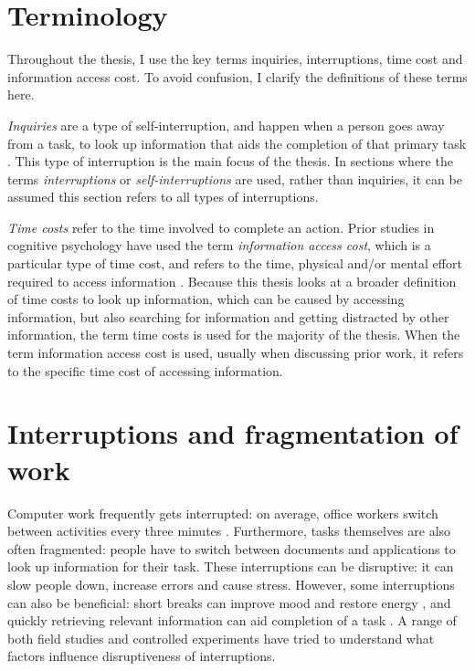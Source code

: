 \section{Terminology}
Throughout the thesis, I use the key terms inquiries, interruptions, time cost and information access cost. To avoid confusion, I clarify the definitions of these terms here.

\textit{Inquiries} are a type of self-interruption, and happen when a person goes away from a task, to look up information that aids the completion of that primary task \citep{Jin2009}. This type of interruption is the main focus of the thesis. In sections where the terms \textit{interruptions} or \textit{self-interruptions} are used, rather than inquiries, it can be assumed this section refers to all types of interruptions. 

\textit{Time costs} refer to the time involved to complete an action. Prior studies in cognitive psychology have used the term \textit{information access cost}, which  is a particular type of time cost, and refers to the time, physical and/or mental effort required to access information \citep{Gray2006}. Because this thesis looks at a broader definition of time costs to look up information, which can be caused by accessing information, but also searching for information and getting distracted by other information, the term time costs is used for the majority of the thesis. When the term information access cost is used, usually when discussing prior work, it refers to the specific time cost of accessing information. 

\section{Interruptions and fragmentation of work}
Computer work frequently gets interrupted: on average, office workers switch between activities every three minutes \citep{Gonzalez2004}. Furthermore, tasks themselves are also often fragmented: people have to switch between documents and applications to look up information for their task. These interruptions can be disruptive: it can slow people down, increase errors and cause stress. However, some interruptions can also be beneficial: short breaks can improve mood and restore energy \citep{Mark2014a}, and quickly retrieving relevant information can aid completion of a task \citep{Jin2009}. A range of both field studies and controlled experiments have tried to understand what factors influence disruptiveness of interruptions.

